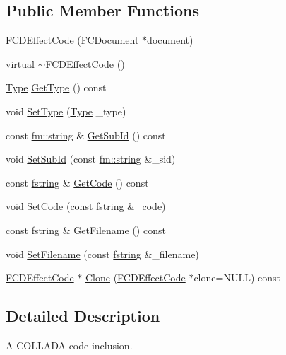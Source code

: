 \subsection*{Public Member Functions}
\begin{DoxyCompactItemize}
\item 
\hyperlink{classFCDEffectCode_a5ba927db410adba1b34e73bd9a3cabe1}{FCDEffectCode} (\hyperlink{classFCDocument}{FCDocument} $\ast$document)
\item 
virtual \hyperlink{classFCDEffectCode_a74f636708ade039da19ef82aea0a14bd}{$\sim$FCDEffectCode} ()
\item 
\hyperlink{classFCDEffectCode_a0e492088a72daaf6e6e14c50d17c9424}{Type} \hyperlink{classFCDEffectCode_a9e00aa62fc3e509f8aedb04443026871}{GetType} () const 
\item 
void \hyperlink{classFCDEffectCode_aee0f522cea26f2b8414c6c023f15702b}{SetType} (\hyperlink{classFCDEffectCode_a0e492088a72daaf6e6e14c50d17c9424}{Type} \_\-type)
\item 
const \hyperlink{classfm_1_1stringT}{fm::string} \& \hyperlink{classFCDEffectCode_a98973fd93404c031bc8282a5f84db017}{GetSubId} () const 
\item 
void \hyperlink{classFCDEffectCode_ab36d40bd36e748634342c24db4b23639}{SetSubId} (const \hyperlink{classfm_1_1stringT}{fm::string} \&\_\-sid)
\item 
const \hyperlink{classfm_1_1stringT}{fstring} \& \hyperlink{classFCDEffectCode_aeb303dd3b3ce37a77955fe4a2fa1986f}{GetCode} () const 
\item 
void \hyperlink{classFCDEffectCode_a10347e9dc00a809f0203cadd55e9ab64}{SetCode} (const \hyperlink{classfm_1_1stringT}{fstring} \&\_\-code)
\item 
const \hyperlink{classfm_1_1stringT}{fstring} \& \hyperlink{classFCDEffectCode_a201251ceb6b7774c33b4cdd64e78b136}{GetFilename} () const 
\item 
void \hyperlink{classFCDEffectCode_a24505787b2431902f598c6454105b737}{SetFilename} (const \hyperlink{classfm_1_1stringT}{fstring} \&\_\-filename)
\item 
\hyperlink{classFCDEffectCode}{FCDEffectCode} $\ast$ \hyperlink{classFCDEffectCode_ac3f31e1734d949b402bf2880ec9e4087}{Clone} (\hyperlink{classFCDEffectCode}{FCDEffectCode} $\ast$clone=NULL) const 
\end{DoxyCompactItemize}


\subsection{Detailed Description}
A COLLADA code inclusion.

